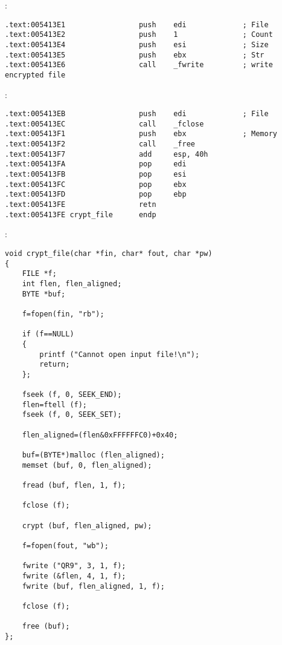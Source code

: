 :

\begin{lstlisting}
.text:005413E1                 push    edi             ; File
.text:005413E2                 push    1               ; Count
.text:005413E4                 push    esi             ; Size
.text:005413E5                 push    ebx             ; Str
.text:005413E6                 call    _fwrite         ; write encrypted file
\end{lstlisting}

:

\begin{lstlisting}
.text:005413EB                 push    edi             ; File
.text:005413EC                 call    _fclose
.text:005413F1                 push    ebx             ; Memory
.text:005413F2                 call    _free
.text:005413F7                 add     esp, 40h
.text:005413FA                 pop     edi
.text:005413FB                 pop     esi
.text:005413FC                 pop     ebx
.text:005413FD                 pop     ebp
.text:005413FE                 retn
.text:005413FE crypt_file      endp
\end{lstlisting}

:

\begin{lstlisting}
void crypt_file(char *fin, char* fout, char *pw)
{
	FILE *f;
	int flen, flen_aligned;
	BYTE *buf;

	f=fopen(fin, "rb");
	
	if (f==NULL)
	{
		printf ("Cannot open input file!\n");
		return;
	};

	fseek (f, 0, SEEK_END);
	flen=ftell (f);
	fseek (f, 0, SEEK_SET);

	flen_aligned=(flen&0xFFFFFFC0)+0x40;

	buf=(BYTE*)malloc (flen_aligned);
	memset (buf, 0, flen_aligned);

	fread (buf, flen, 1, f);

	fclose (f);

	crypt (buf, flen_aligned, pw);
	
	f=fopen(fout, "wb");

	fwrite ("QR9", 3, 1, f);
	fwrite (&flen, 4, 1, f);
	fwrite (buf, flen_aligned, 1, f);

	fclose (f);

	free (buf);
};
\end{lstlisting}

